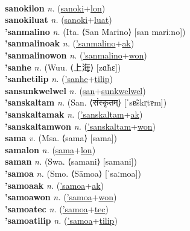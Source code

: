  \label{sanokiles} \\
\textbf{sanokilon} \textit{n.} (\hyperref[sanoki]{sanoki}+\hyperref[lon]{lon})
 \label{sanokilon} \\
\textbf{sanokiluat} \textit{n.} (\hyperref[sanoki]{sanoki}+\hyperref[luat]{luat})
 \label{sanokiluat} \\
\textbf{'sanmalino} \textit{n.} (Ita. ⟨San Marino⟩ [san mariːno])
 \label{'sanmalino} \\
\textbf{'sanmalinoak} \textit{n.} (\hyperref['sanmalino]{'sanmalino}+\hyperref[ak]{ak})
 \label{'sanmalinoak} \\
\textbf{'sanmalinowon} \textit{n.} (\hyperref['sanmalino]{'sanmalino}+\hyperref[won]{won})
 \label{'sanmalinowon} \\
\textbf{'sanhe} \textit{n.} (Wuu. ⟨上海⟩ [zɑ̃hɛ])
 \label{'sanhe} \\
\textbf{'sanhetilip} \textit{n.} (\hyperref['sanhe]{'sanhe}+\hyperref[tilip]{tilip})
 \label{'sanhetilip} \\
\textbf{sansunkwelwel} \textit{n.} (\hyperref[san]{san}+\hyperref[sunkwelwel]{sunkwelwel})
 \label{sansunkwelwel} \\
\textbf{'sanskaltam} \textit{n.} (San. ⟨संस्कृतम्⟩ [ˈsɐ̃skr̩tɐm])
 \label{'sanskaltam} \\
\textbf{'sanskaltamak} \textit{n.} (\hyperref['sanskaltam]{'sanskaltam}+\hyperref[ak]{ak})
 \label{'sanskaltamak} \\
\textbf{'sanskaltamwon} \textit{n.} (\hyperref['sanskaltam]{'sanskaltam}+\hyperref[won]{won})
 \label{'sanskaltamwon} \\
\textbf{sama} \textit{v.} (Msa. ⟨sama⟩ [sama])
 \label{sama} \\
\textbf{samalon} \textit{n.} (\hyperref[sama]{sama}+\hyperref[lon]{lon})
 \label{samalon} \\
\textbf{saman} \textit{n.} (Swa. ⟨samani⟩ [samani])
 \label{saman} \\
\textbf{'samoa} \textit{n.} (Smo. ⟨Sāmoa⟩ [ˈsaːmoa])
 \label{'samoa} \\
\textbf{'samoaak} \textit{n.} (\hyperref['samoa]{'samoa}+\hyperref[ak]{ak})
 \label{'samoaak} \\
\textbf{'samoawon} \textit{n.} (\hyperref['samoa]{'samoa}+\hyperref[won]{won})
 \label{'samoawon} \\
\textbf{'samoatec} \textit{n.} (\hyperref['samoa]{'samoa}+\hyperref[tec]{tec})
 \label{'samoatec} \\
\textbf{'samoatilip} \textit{n.} (\hyperref['samoa]{'samoa}+\hyperref[tilip]{tilip})
